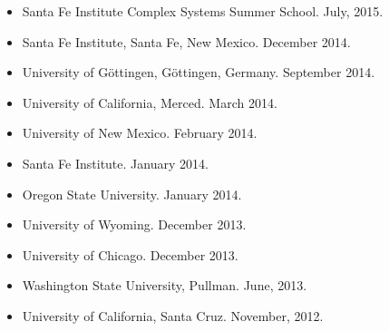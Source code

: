 \documentclass[margin,line,12pt]{res}
\begin{document}
\begin{resume}
\begin{itemize}
\item Santa Fe Institute Complex Systems Summer School. July, 2015.

\item Santa Fe Institute, Santa Fe, New Mexico. December 2014.

\item University of G\"ottingen, G\"ottingen, Germany. September 2014.

\item University of California, Merced. March 2014.

\item University of New Mexico. February 2014.

\item Santa Fe Institute. January 2014.

\item Oregon State University. January 2014.

\item University of Wyoming. December 2013.

\item University of Chicago. December 2013.

\item Washington State University, Pullman. June, 2013.

\item University of California, Santa Cruz. November, 2012.


\end{itemize}
\end{resume}
\end{document}
